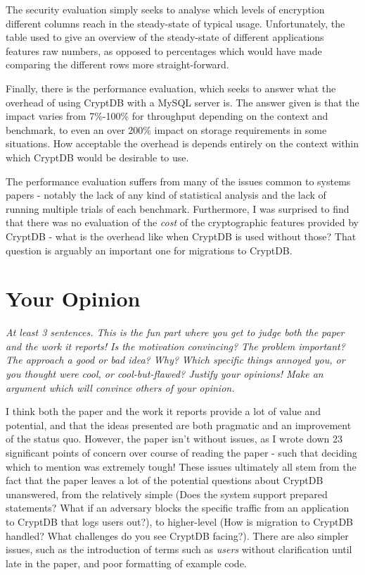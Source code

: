 \documentclass[11pt]{article}
\begin{document}
The security evaluation simply seeks to analyse which levels of encryption
different columns reach in the steady-state of typical usage. Unfortunately,
the table used to give an overview of the steady-state of different
applications features raw numbers, as opposed to percentages which would have
made comparing the different rows more straight-forward.

Finally, there is the performance evaluation, which seeks to answer what the
overhead of using CryptDB with a MySQL server is. The answer given is that the
impact varies from 7\%-100\% for throughput depending on the context and
benchmark, to even an over 200\% impact on storage requirements in some
situations. How acceptable the overhead is depends entirely on the context
within which CryptDB would be desirable to use.

The performance evaluation suffers from many of the issues common to systems
papers - notably the lack of any kind of statistical analysis and the lack of
running multiple trials of each benchmark. Furthermore, I was surprised to find
that there was no evaluation of the \textit{cost} of the cryptographic features
provided by CryptDB - what is the overhead like when CryptDB is used without
those? That question is arguably an important one for migrations to CryptDB.

\section*{Your Opinion}

\textsl{At least 3 sentences. This is the fun part where you get to judge both
the paper and the work it reports! Is the motivation convincing? The problem
important? The approach a good or bad idea? Why? Which specific things annoyed
you, or you thought were cool, or cool-but-flawed? Justify your opinions! Make
an argument which will convince others of your opinion.}

I think both the paper and the work it reports provide a lot of value and
potential, and that the ideas presented are both pragmatic and an improvement
of the status quo. However, the paper isn't without issues, as I wrote down 23
significant points of concern over course of reading the paper - such that
deciding which to mention was extremely tough! These issues ultimately all stem
from the fact that the paper leaves a lot of the potential questions about
CryptDB unanswered, from the relatively simple (Does the system support
prepared statements? What if an adversary blocks the specific traffic from an
application to CryptDB that logs users out?), to higher-level (How is migration
to CryptDB handled? What challenges do you see CryptDB facing?). There are also
simpler issues, such as the introduction of terms such as \textit{users} without
clarification until late in the paper, and poor formatting of example code.
\end{document}
